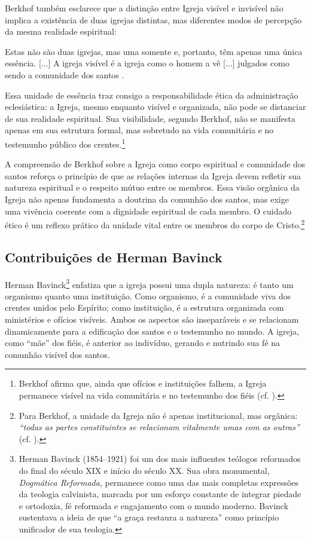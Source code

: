 Berkhof também esclarece que a distinção entre Igreja visível e invisível não implica a existência de duas igrejas distintas, mas diferentes modos de percepção da mesma realidade espiritual:

\begin{citacao}
    Estas não são duas igrejas, mas uma somente e, portanto, têm apenas uma única essência. [...] A igreja visível é a igreja como o homem a vê [...] julgados como sendo a comunidade dos santos \cite[p.~642]{berkhof2012}.
\end{citacao}

Essa unidade de essência traz consigo a responsabilidade ética da administração eclesiástica: a Igreja, mesmo enquanto visível e organizada, não pode se distanciar de sua realidade espiritual. Sua visibilidade, segundo Berkhof, não se manifesta apenas em sua estrutura formal, mas sobretudo na vida comunitária e no testemunho público dos crentes.\footnote{Berkhof afirma que, ainda que ofícios e instituições falhem, a Igreja permanece visível na vida comunitária e no testemunho dos fiéis (cf. \cite[p.~645]{berkhof2012}).}

A compreensão de Berkhof sobre a Igreja como corpo espiritual e comunidade dos santos reforça o princípio de que as relações internas da Igreja devem refletir sua natureza espiritual e o respeito mútuo entre os membros. Essa visão orgânica da Igreja não apenas fundamenta a doutrina da comunhão dos santos, mas exige uma vivência coerente com a dignidade espiritual de cada membro. O cuidado ético é um reflexo prático da unidade vital entre os membros do corpo de Cristo.\footnote{Para Berkhof, a unidade da Igreja não é apenas institucional, mas orgânica: \textit{``todas as partes constituintes se relacionam vitalmente umas com as outras''} (cf. \cite[p.~646]{berkhof2012}).}

\subsection{Contribuições de Herman Bavinck}

Herman Bavinck\footnote{Herman Bavinck (1854–1921) foi um dos mais influentes teólogos reformados do final do século XIX e início do século XX. Sua obra monumental, \textit{Dogmática Reformada}, permanece como uma das mais completas expressões da teologia calvinista, marcada por um esforço constante de integrar piedade e ortodoxia, fé reformada e engajamento com o mundo moderno. Bavinck sustentava a ideia de que ``a graça restaura a natureza'' como princípio unificador de sua teologia.} enfatiza que a igreja possui uma dupla natureza: é tanto um organismo quanto uma instituição. Como organismo, é a comunidade viva dos crentes unidos pelo Espírito; como instituição, é a estrutura organizada com ministérios e ofícios visíveis. Ambos os aspectos são inseparáveis e se relacionam dinamicamente para a edificação dos santos e o testemunho no mundo. A igreja, como ``mãe'' dos fiéis, é anterior ao indivíduo, gerando e nutrindo sua fé na comunhão visível dos santos.\cite{bavinck2012}

